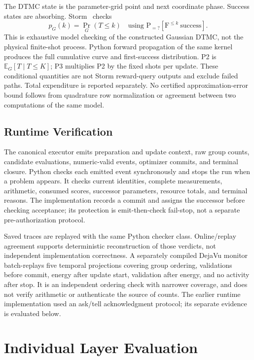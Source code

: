 \documentclass[conference]{IEEEtran}
\begin{document}
The DTMC state is the parameter-grid point and next coordinate phase. Success states are absorbing. Storm~\cite{storm} checks
\begin{equation}
 p_G(k)=\Pr_G(T\leq k)
 \quad\text{using }\mathrm{P}_{=?}[\mathrm F^{\leq k}\ \mathrm{success}].
 \label{eq:reachability}
\end{equation}
This is exhaustive model checking of the constructed Gaussian DTMC, not the physical finite-shot process. Python forward propagation of the same kernel produces the full cumulative curve and first-success distribution. P2 is $\mathbb E_G[T\mid T\leq K]$; P3 multiplies P2 by the fixed shots per update. These conditional quantities are not Storm reward-query outputs and exclude failed paths. Total expenditure is reported separately. No certified approximation-error bound follows from quadrature row normalization or agreement between two computations of the same model.

\subsection{Runtime Verification}
\label{sec:runtime}
The canonical executor emits preparation and update context, raw group counts, candidate evaluations, numeric-valid events, optimizer commits, and terminal closure. Python checks each emitted event synchronously and stops the run when a problem appears. It checks current identities, complete measurements, arithmetic, consumed scores, successor parameters, resource totals, and terminal reasons. The implementation records a commit and assigns the successor before checking acceptance; its protection is emit-then-check fail-stop, not a separate pre-authorization protocol.

Saved traces are replayed with the same Python checker class. Online/replay agreement supports deterministic reconstruction of those verdicts, not independent implementation correctness. A separately compiled DejaVu monitor~\cite{dejavu} batch-replays five temporal projections covering group ordering, validations before commit, energy after update start, validation after energy, and no activity after stop. It is an independent ordering check with narrower coverage, and does not verify arithmetic or authenticate the source of counts. The earlier runtime implementation used an ask/tell acknowledgment protocol; its separate evidence is evaluated below.

\section{Individual Layer Evaluation}
\label{sec:individual}
\end{document}
